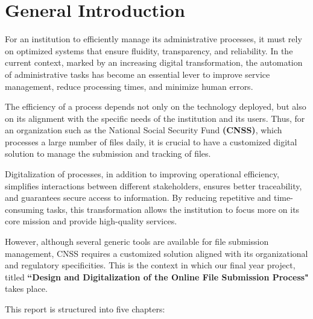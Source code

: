 \chapter*{General Introduction}

\Large For an institution to efficiently manage its administrative processes, it must rely on optimized systems that ensure fluidity, transparency, and reliability. In the current context, marked by an increasing digital transformation, the automation of administrative tasks has become an essential lever to improve service management, reduce processing times, and minimize human errors.

The efficiency of a process depends not only on the technology deployed, but also on its alignment with the specific needs of the institution and its users. Thus, for an organization such as the National Social Security Fund \textbf{(CNSS)}, which processes a large number of files daily, it is crucial to have a customized digital solution to manage the submission and tracking of files.

Digitalization of processes, in addition to improving operational efficiency, simplifies interactions between different stakeholders, ensures better traceability, and guarantees secure access to information. By reducing repetitive and time-consuming tasks, this transformation allows the institution to focus more on its core mission and provide high-quality services.

However, although several generic tools are available for file submission management, CNSS requires a customized solution aligned with its organizational and regulatory specificities. This is the context in which our final year project, titled \textbf{“Design and Digitalization of the Online File Submission Process"} takes place.

This report is structured into five chapters:

